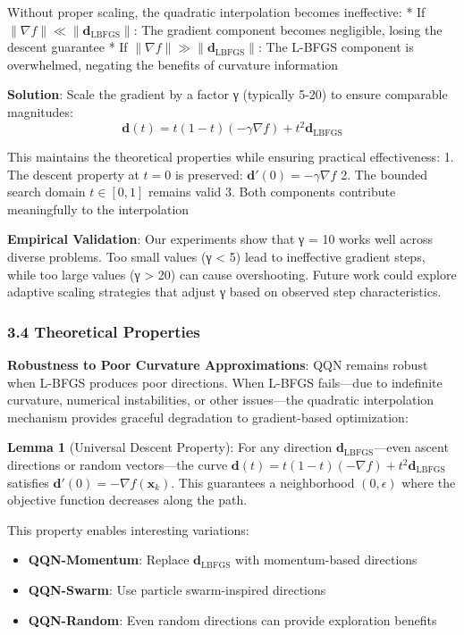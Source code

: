 Without proper scaling, the quadratic interpolation becomes ineffective:
* If \(\|\nabla f\| \ll \|\mathbf{d}_{\text{LBFGS}}\|\): The gradient component becomes negligible, losing the descent guarantee
* If \(\|\nabla f\| \gg \|\mathbf{d}_{\text{LBFGS}}\|\): The L-BFGS component is overwhelmed, negating the benefits of curvature information

\textbf{Solution}: Scale the gradient by a factor γ (typically 5-20) to ensure comparable magnitudes:
\[\mathbf{d}(t) = t(1-t)(-\gamma \nabla f) + t^2 \mathbf{d}_{\text{LBFGS}}\]

This maintains the theoretical properties while ensuring practical effectiveness:
1. The descent property at \(t=0\) is preserved: \(\mathbf{d}'(0) = -\gamma \nabla f\)
2. The bounded search domain \(t \in [0,1]\) remains valid
3. Both components contribute meaningfully to the interpolation

\textbf{Empirical Validation}: Our experiments show that γ = 10 works well across diverse problems. Too small values (γ \textless{} 5) lead to ineffective gradient steps, while too large values (γ \textgreater{} 20) can cause overshooting. Future work could explore adaptive scaling strategies that adjust γ based on observed step characteristics.

\hypertarget{theoretical-properties}{%
\subsubsection{3.4 Theoretical Properties}\label{theoretical-properties}}

\textbf{Robustness to Poor Curvature Approximations}: QQN remains robust when L-BFGS produces poor directions.
When L-BFGS fails---due to indefinite curvature, numerical instabilities, or other issues---the quadratic interpolation mechanism provides graceful degradation to gradient-based optimization:

\textbf{Lemma 1} (Universal Descent Property): For any direction \(\mathbf{d}_{\text{LBFGS}}\)---even ascent directions or random vectors---the curve \(\mathbf{d}(t) = t(1-t)(-\nabla f) + t^2 \mathbf{d}_{\text{LBFGS}}\) satisfies \(\mathbf{d}'(0) = -\nabla f(\mathbf{x}_k)\). This guarantees a neighborhood \((0, \epsilon)\) where the objective function decreases along the path.

This property enables interesting variations:

\begin{itemize}
\tightlist
\item
  \textbf{QQN-Momentum}: Replace \(\mathbf{d}_{\text{LBFGS}}\) with momentum-based directions
\item
  \textbf{QQN-Swarm}: Use particle swarm-inspired directions
\item
  \textbf{QQN-Random}: Even random directions can provide exploration benefits
\end{itemize}

